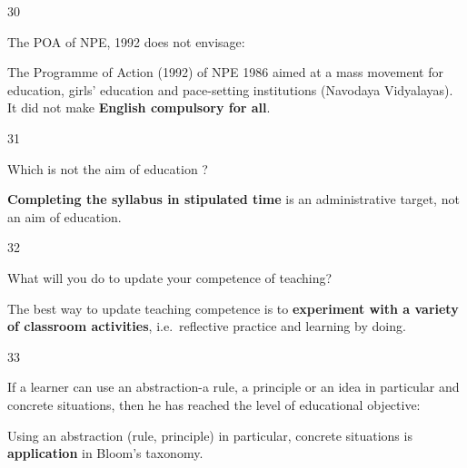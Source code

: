 \begin{question}{30}
{The POA of NPE, 1992 does not envisage:\par}
\begin{explain}
The Programme of Action (1992) of NPE 1986 aimed at a mass movement for education, girls' education and pace-setting institutions (Navodaya Vidyalayas). It did not make \textbf{English compulsory for all}.
\end{explain}
\end{question}

\begin{question}{31}
{Which is not the aim of education ?\par}
\begin{explain}
\textbf{Completing the syllabus in stipulated time} is an administrative target, not an aim of education.
\end{explain}
\end{question}

\begin{question}{32}
{What will you do to update your competence of teaching?\par}
\begin{explain}
The best way to update teaching competence is to \textbf{experiment with a variety of classroom activities}, i.e.\ reflective practice and learning by doing.
\end{explain}
\end{question}

\begin{question}{33}
{If a learner can use an abstraction-a rule, a principle or an idea in particular and concrete situations, then he has reached the level of educational objective:\par}
\begin{explain}
Using an abstraction (rule, principle) in particular, concrete situations is \textbf{application} in Bloom's taxonomy.
\end{explain}
\end{question}

